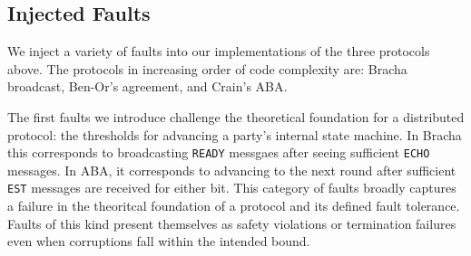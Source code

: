 \subsection{Injected Faults}
We inject a variety of faults into our implementations of the three protocols above.
The protocols in increasing order of code complexity are: Bracha broadcast, Ben-Or's agreement, and Crain's ABA.

The first faults we introduce challenge the theoretical foundation for a distributed protocol: the thresholds for advancing a party's internal state machine. 
In Bracha this corresponds to broadcasting \texttt{READY} messgaes after seeing sufficient \texttt{ECHO} messages.
In ABA, it corresponds to advancing to the next round after sufficient \texttt{EST} messages are received for either bit.
This category of faults broadly captures a failure in the theoritcal foundation of a protocol and its defined fault tolerance. 
Faults of this kind present themselves as safety violations or termination failures even when corruptions fall within the intended bound. 










